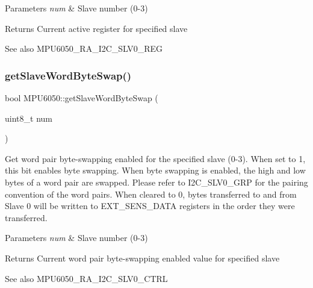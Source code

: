 \begin{DoxyParams}{Parameters}
{\em num} & Slave number (0-\/3) \\
\hline
\end{DoxyParams}
\begin{DoxyReturn}{Returns}
Current active register for specified slave 
\end{DoxyReturn}
\begin{DoxySeeAlso}{See also}
M\+P\+U6050\+\_\+\+R\+A\+\_\+\+I2\+C\+\_\+\+S\+L\+V0\+\_\+\+R\+EG 
\end{DoxySeeAlso}
\mbox{\label{class_m_p_u6050_a18e8f3d053a68f0e5ecf497c87ecac8a}} 
\subsubsection{\texorpdfstring{getSlaveWordByteSwap()}{getSlaveWordByteSwap()}}
{\footnotesize\ttfamily bool M\+P\+U6050\+::get\+Slave\+Word\+Byte\+Swap (\begin{DoxyParamCaption}\item[{uint8\+\_\+t}]{num }\end{DoxyParamCaption})}

Get word pair byte-\/swapping enabled for the specified slave (0-\/3). When set to 1, this bit enables byte swapping. When byte swapping is enabled, the high and low bytes of a word pair are swapped. Please refer to I2\+C\+\_\+\+S\+L\+V0\+\_\+\+G\+RP for the pairing convention of the word pairs. When cleared to 0, bytes transferred to and from Slave 0 will be written to E\+X\+T\+\_\+\+S\+E\+N\+S\+\_\+\+D\+A\+TA registers in the order they were transferred.


\begin{DoxyParams}{Parameters}
{\em num} & Slave number (0-\/3) \\
\hline
\end{DoxyParams}
\begin{DoxyReturn}{Returns}
Current word pair byte-\/swapping enabled value for specified slave 
\end{DoxyReturn}
\begin{DoxySeeAlso}{See also}
M\+P\+U6050\+\_\+\+R\+A\+\_\+\+I2\+C\+\_\+\+S\+L\+V0\+\_\+\+C\+T\+RL 
\end{DoxySeeAlso}
\mbox{\label{class_m_p_u6050_a32ce8023bb80afc5d55811de70c7214f}} 
